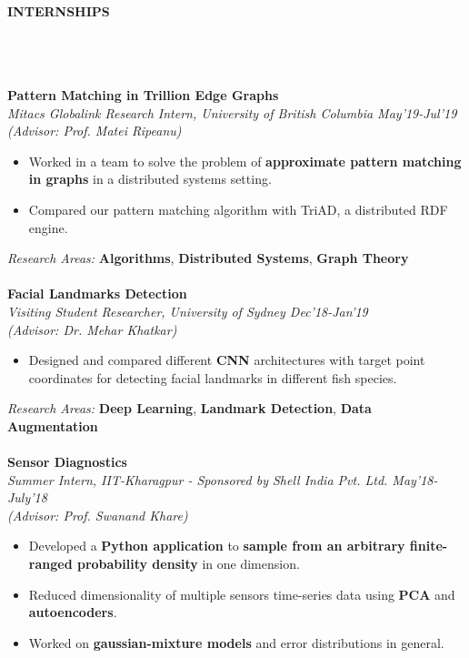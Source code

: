 \documentclass[letter,10pt]{book}
\newcommand{\lsep}{-0.5cm}
\newcommand{\psep}{-0.6cm}
\newcommand{\resheading}[1]{{\small \colorbox{mygrey}{\begin{minipage}{0.975\textwidth}{\textbf{#1 \vphantom{p\^{E}}}}\end{minipage}}}}
\begin{document}
\hfill 
\hspace{0.5cm}\\
\resheading{\textbf{INTERNSHIPS} }\\[\lsep]
\\\\
\large \textbf{Pattern Matching in Trillion Edge Graphs} \normalsize \\
\emph{Mitacs Globalink Research Intern, University of British Columbia \hfill May'19-Jul'19 } \\ 
\emph{(Advisor: Prof. Matei Ripeanu)} \\[\lsep]
\begin{itemize}
\item Worked in a team to solve the problem of \textbf{approximate pattern matching in graphs} in a distributed systems setting.\\[\psep]
\item  Compared our pattern matching algorithm with TriAD, a distributed RDF engine.
\\[\lsep]
\end{itemize}
\emph{Research Areas:}  \textbf{Algorithms}, \textbf{Distributed Systems},
\textbf{Graph Theory}
\\\\
\large \textbf{Facial Landmarks Detection} \normalsize \\
\emph{Visiting Student Researcher, University of Sydney \hfill Dec'18-Jan'19} \\ 
\emph{(Advisor: Dr. Mehar Khatkar)} \\[\lsep]
\begin{itemize}
	\item  Designed and compared different \textbf{CNN} architectures with target point coordinates for detecting facial landmarks in different fish species.
	\\[\lsep]
\end{itemize}
\emph{Research Areas:}  \textbf{Deep Learning}, \textbf{Landmark Detection},
\textbf{Data Augmentation}
\\\\
\large \textbf{Sensor Diagnostics} \normalsize \\
\emph{Summer Intern, IIT-Kharagpur - Sponsored by Shell India Pvt. Ltd. \hfill May'18-July'18} \\ 
\emph{(Advisor: Prof. Swanand Khare)} \\[\lsep]
\begin{itemize}
\item  Developed a \textbf{Python application} to \textbf{sample from an arbitrary finite-ranged probability density} in one dimension.\\[\psep]
\item Reduced dimensionality of multiple sensors time-series data using \textbf{PCA} and \textbf{autoencoders}.\\[\psep]
\item Worked on \textbf{gaussian-mixture models} and error distributions in general.\\[\lsep]
\end{itemize}
\end{document}
